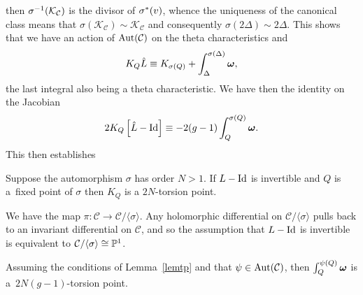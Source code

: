 \documentclass[pdftex]{sigma}
\numberwithin{equation}{section}
\def\Aut{\mathop{\rm Aut}\nolimits}
\def\id{\mathop{\rm Id}\nolimits}
\begin{document}
then $\sigma\sp{-1}(\mathcal{K}_\mathcal{C})$ is the divisor of
$\sigma\sp\ast(v)$, whence the uniqueness of the canonical class
means that
$\sigma(\mathcal{K}_\mathcal{C})\sim\mathcal{K}_\mathcal{C}$ and
consequently $\sigma(2\Delta)\sim2\Delta$.
This shows that we have an action of $\Aut(\mathcal{C})$ on the theta characteristics and
\[
K_Q \hat{L}\equiv K_{\sigma(Q)}+\int_\Delta\sp{\sigma(\Delta)}{\boldsymbol{\omega}} ,
\]
the last integral also being a theta characteristic.
We have then the
identity on the Jacobian
\begin{equation*}%
2K_Q\left[\hat{L}-\id\right]\equiv-
2(g-1)\int_Q\sp{\sigma(Q)}{\boldsymbol{\omega}}.
\end{equation*}
This then establishes
\begin{lemma}\label{lemtp} Suppose the automorphism $\sigma$ has order $N>1$. If $L-\id$ is invertible and $Q$ is a~fixed point of $\sigma$ then $K_Q$ is a $2N$-torsion point.
\end{lemma}

\begin{remark} We have the map
$\pi:\mathcal{C}\rightarrow\mathcal{C}/\langle \sigma\rangle$. Any holomorphic
dif\/ferential on $\mathcal{C}/\langle\sigma\rangle$ pulls back to an invariant
dif\/ferential on $\mathcal{C}$, and so the assumption that $L-\id$ is
invertible is equivalent to
$\mathcal{C}/\langle \sigma\rangle \cong\mathbb{P}\sp1$.
\end{remark}

\begin{corollary}\label{cortp} Assuming the conditions of  Lemma~{\rm \ref{lemtp}} and
that $\psi\in\Aut(\mathcal{C})$, then $\int_Q\sp{\psi(Q)}{\boldsymbol{\omega}}$ is a~$2N(g-1)$-torsion
point.
\end{corollary}
\end{document}
